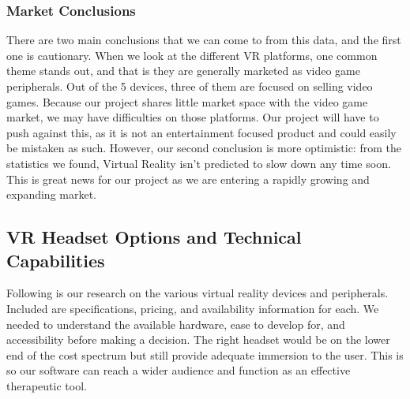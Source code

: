 \documentclass[a4paper,10pt]{article}
\begin{document}
\subsubsection{Market Conclusions}

There are two main conclusions that we can come to from this data, and the first one is cautionary.  When we look at the different VR platforms, one common theme stands out, and that is they are generally marketed as video game peripherals.  Out of the 5 devices, three of them are focused on selling video games.  Because our project shares little market space with the video game market, we may have difficulties on those platforms.  Our project will have to push against this, as it is not an entertainment focused product and could easily be mistaken as such.  However, our second conclusion is more optimistic: from the statistics we found, Virtual Reality isn't predicted to slow down any time soon.  This is great news for our project as we are entering a rapidly growing and expanding market.


\subsection{VR Headset Options and Technical Capabilities}
\label{section:headset}

Following is our research on the various virtual reality devices and peripherals. Included are specifications, pricing, and availability information for each. We needed to understand the available hardware, ease to develop for, and accessibility before making a decision. The right headset would be on the lower end of the cost spectrum but still provide adequate immersion to the user. This is so our software can reach a wider audience and function as an effective therapeutic tool.

\pagebreak   
\end{document}
